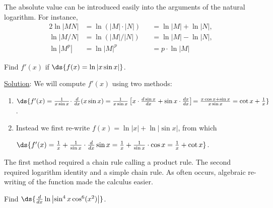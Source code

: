 The absolute value can be introduced easily into the arguments
of the natural logarithm.  For instance,\footnotemark
\begin{alignat*}{2}
\ln|MN|&=\ln(|M|\cdot|N|)&&=\ln|M|+\ln|N|,\\
\ln|M/N|&=\ln(|M|/|N|)&&=\ln|M|-\ln|N|,\\
\ln\left|M^p\right|&=\ln|M|^p&&=p\cdot\ln|M|\end{alignat*}

\bex Find $f'(x)$ if $\ds{f(x)=\ln\left|x\sin x\right|}$.

\underline{Solution}: We will compute $f'(x)$ using two 
methods:
\begin{enumerate}
\item $\ds{f'(x)=\frac1{x\sin x}\!\cdot\frac{d}{dx}(x\sin x)
                =\frac1{x\sin x}\left[x\cdot\frac{d\sin x}{dx}
                                       +\sin x\cdot\frac{dx}{dx}\right]\!
                =\frac{x\cos x+\sin x}{x\sin x}=\cot x+\frac1x}$.
\item Instead we first re-write $f(x)=\ln|x|+\ln|\sin x|$, from which

      $\ds{f'(x)=\frac1x+\frac{1}{\sin x}\cdot\frac{d}{dx}\sin x
                =\frac1x+\frac1{\sin x}\cdot\cos x
                =\frac1x+\cot x}$.
\end{enumerate}
The first method required a chain rule calling a product rule.
The second required logarithm identity and a simple chain rule.
As often occurs, algebraic re-writing of the function made 
the calculus easier.
\label{ExampleOfLogDerivBefore/AfterRewriting}\eex 



\bex Find $\ds{\frac{d}{dx}\ln\left|\sin^4x\cos^6(x^2)\right|}$.

